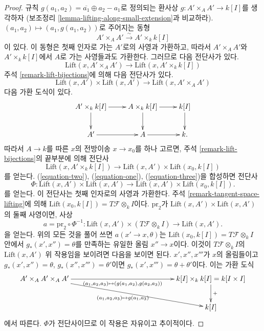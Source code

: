\begin{proof}
규칙 $g(a_1, a_2) = \overline{a_1} \oplus a_2 - a_1$로 정의되는
환사상 $g : A' \times_A A' \to k[I]$를 생각하자
(보조정리 \ref{lemma-lifting-along-small-extension}과 비교하라).
$(a_1, a_2) \mapsto (a_1, g(a_1, a_2))$로 주어지는 동형
$$
A' \times_A A' \xrightarrow{\sim} A' \times_k k[I]
$$
이 있다. 이 동형은 첫째 인자로 가는 $A'$로의 사영과 가환하고,
따라서 $A' \times_A A'$와 $A' \times_k k[I]$에서 $A$로 가는
사영들과도 가환한다. 그러므로 다음 전단사가 있다.
\begin{equation}
\label{equation-one}
\text{Lift}(x, A' \times_A A')
\longrightarrow
\text{Lift}(x, A' \times_k k[I])
\end{equation}
주석 \ref{remark-lift-bijections}에 의해 다음 전단사가 있다.
\begin{equation}
\label{equation-two}
\text{Lift}(x, A') \times \text{Lift}(x, A')
\longrightarrow
\text{Lift}(x, A' \times_A A')
\end{equation}
다음 가환 도식이 있다.
$$
\xymatrix{
A' \times_k k[I] \ar[r] \ar[d] & A \times_k k[I] \ar[r] \ar[d] & k[I] \ar[d] \\
A' \ar[r] & A \ar[r] & k.
}
$$
따라서 $A \to k$를 따른 $x$의 전방이송 $x \to x_0$를 하나 고르면,
주석 \ref{remark-lift-bijections}의 끝부분에 의해 전단사
\begin{equation}
\label{equation-three}
\text{Lift}(x, A' \times_k k[I])
\longrightarrow
\text{Lift}(x, A') \times \text{Lift}(x_0, k[I])
\end{equation}
를 얻는다. (\ref{equation-two}), (\ref{equation-one}),
(\ref{equation-three})을 합성하면 전단사
$$
\Phi :
\text{Lift}(x, A') \times \text{Lift}(x, A')
\longrightarrow
\text{Lift}(x, A') \times \text{Lift}(x_0, k[I]).
$$
를 얻는다. 이 전단사는 첫째 인자로의 사영과 가환한다.
주석 \ref{remark-tangent-space-lifting}에 의해
$\text{Lift}(x_0, k[I]) = T\mathcal{F} \otimes_k I$이다.
$\text{pr}_2$가
$\text{Lift}(x, A') \times \text{Lift}(x, A')$의 둘째 사영이면,
사상
$$
a = \text{pr}_2 \circ \Phi^{-1} :
\text{Lift}(x, A') \times (T\mathcal{F} \otimes_k I)
\longrightarrow
\text{Lift}(x, A').
$$
을 얻는다. 위의 모든 것을 풀어 쓰면 $a(x' \to x, \theta)$는
$\text{Lift}(x_0, k[I]) = T\mathcal{F} \otimes_k I$ 안에서
$g_*(x', x'') = \theta$를 만족하는 유일한 올림 $x'' \to x$이다.
이것이 $T\mathcal{F} \otimes_k I$의 $\text{Lift}(x, A')$ 위 작용임을
보이려면 다음을 보이면 된다. $x', x'', x'''$가 $x$의 올림들이고
$g_*(x', x'') = \theta$, $g_*(x'', x''') = \theta'$이면
$g_*(x', x''') = \theta + \theta'$이다. 이는 가환 도식
$$
\xymatrix{
A' \times_A A' \times_A A'
\ar[rrrrr]_-{(a_1, a_2, a_3) \mapsto (g(a_1, a_2), g(a_2, a_3))}
\ar[rrrrrd]_{(a_1, a_2, a_3) \mapsto g(a_1, a_3)} & & & & &
k[I] \times_k k[I] = k[I \times I] \ar[d]^{+} \\
& & & & & k[I]
}
$$
에서 따른다. $\Phi$가 전단사이므로 이 작용은 자유이고 추이적이다.
\end{proof}


